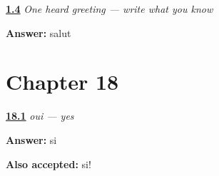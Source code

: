 \noindent\begin{minipage}[t]{\linewidth}
\raggedright
\hyperlink{review-FR-W01-salut-dictation-answer}{\textbf{1.4}} \emph{One heard greeting — write what you know}\par
\small \textbf{Answer:} salut\par
\end{minipage}\par\medskip

\section*{Chapter 18}

\noindent\begin{minipage}[t]{\linewidth}
\raggedright
\hyperlink{review-FR-C18-oui-negative}{\textbf{18.1}} \emph{oui — yes}\par
\small \textbf{Answer:} si\par
\footnotesize \textbf{Also accepted:} si!
\end{minipage}\par\medskip

